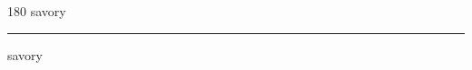 
\begin{frame}
\begin{center}
\begin{turn}{180}
{\fontsize{2.5cm}{1em}\selectfont savory}
\end{turn}
\vspace{1em}\par  
\hrule
\vspace{1em}\par  
{\fontsize{2.5cm}{1em}\selectfont savory}
\end{center}
\end{frame}
